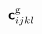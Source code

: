 \documentclass[10pt,letterpaper,oneside]{report}
\newcommand{\ten}[1]{\mbox{\boldmath $#1$}{}}
\newcommand{\tenf}[1]{\mbox{{\sffamily{\bfseries {#1}}}}}
\newcommand{\scas}[1]{\mbox{{\scriptsize{${\rm{#1}}$}}}{}}
\begin{document}
\begin{align}
\tenf{c}^{\scas{g}}_{ijkl} 

\end{align}
\end{document}
